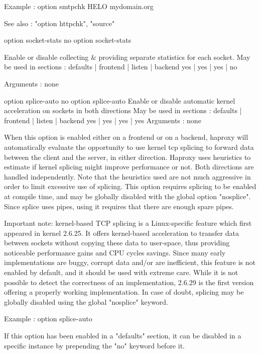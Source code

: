   Example :
        option smtpchk HELO mydomain.org

  See also : "option httpchk", "source"


option socket-stats
no option socket-stats

  Enable or disable collecting & providing separate statistics for each socket.
  May be used in sections :   defaults | frontend | listen | backend
                                 yes   |    yes   |   yes  |   no

  Arguments : none


option splice-auto
no option splice-auto
  Enable or disable automatic kernel acceleration on sockets in both directions
  May be used in sections :   defaults | frontend | listen | backend
                                 yes   |    yes   |   yes  |   yes
  Arguments : none

  When this option is enabled either on a frontend or on a backend, haproxy
  will automatically evaluate the opportunity to use kernel tcp splicing to
  forward data between the client and the server, in either direction. Haproxy
  uses heuristics to estimate if kernel splicing might improve performance or
  not. Both directions are handled independently. Note that the heuristics used
  are not much aggressive in order to limit excessive use of splicing. This
  option requires splicing to be enabled at compile time, and may be globally
  disabled with the global option "nosplice". Since splice uses pipes, using it
  requires that there are enough spare pipes.

  Important note: kernel-based TCP splicing is a Linux-specific feature which
  first appeared in kernel 2.6.25. It offers kernel-based acceleration to
  transfer data between sockets without copying these data to user-space, thus
  providing noticeable performance gains and CPU cycles savings. Since many
  early implementations are buggy, corrupt data and/or are inefficient, this
  feature is not enabled by default, and it should be used with extreme care.
  While it is not possible to detect the correctness of an implementation,
  2.6.29 is the first version offering a properly working implementation. In
  case of doubt, splicing may be globally disabled using the global "nosplice"
  keyword.

  Example :
        option splice-auto

  If this option has been enabled in a "defaults" section, it can be disabled
  in a specific instance by prepending the "no" keyword before it.

